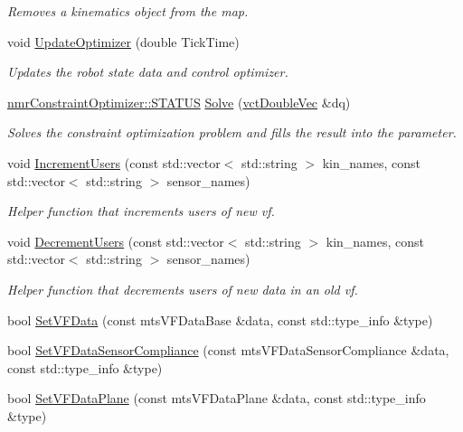 \begin{DoxyCompactItemize}
\begin{DoxyCompactList}\small\item\em Removes a kinematics object from the map. \end{DoxyCompactList}\item 
void \hyperlink{classmts_v_f_controller_a9ea569dcf499c4a086ef9e9751c9e55e}{Update\+Optimizer} (double Tick\+Time)
\begin{DoxyCompactList}\small\item\em Updates the robot state data and control optimizer. \end{DoxyCompactList}\item 
\hyperlink{classnmr_constraint_optimizer_ad46bf972892431d2c0a43a7099aec898}{nmr\+Constraint\+Optimizer\+::\+S\+T\+A\+T\+U\+S} \hyperlink{classmts_v_f_controller_a8f672fd70223794ef98ecf237589cc44}{Solve} (\hyperlink{vct_dynamic_vector_types_8h_ade4b3068c86fb88f41af2e5187e491c2}{vct\+Double\+Vec} \&dq)
\begin{DoxyCompactList}\small\item\em Solves the constraint optimization problem and fills the result into the parameter. \end{DoxyCompactList}\item 
void \hyperlink{classmts_v_f_controller_a0a0eb21d7cad2a07000411e0bb82d34a}{Increment\+Users} (const std\+::vector$<$ std\+::string $>$ kin\+\_\+names, const std\+::vector$<$ std\+::string $>$ sensor\+\_\+names)
\begin{DoxyCompactList}\small\item\em Helper function that increments users of new vf. \end{DoxyCompactList}\item 
void \hyperlink{classmts_v_f_controller_aecb932995a8b1fb3cdfa57ba38947d85}{Decrement\+Users} (const std\+::vector$<$ std\+::string $>$ kin\+\_\+names, const std\+::vector$<$ std\+::string $>$ sensor\+\_\+names)
\begin{DoxyCompactList}\small\item\em Helper function that decrements users of new data in an old vf. \end{DoxyCompactList}\item 
bool \hyperlink{classmts_v_f_controller_a9440eb1cf7cf204da43730bfcbe00ca8}{Set\+V\+F\+Data} (const mts\+V\+F\+Data\+Base \&data, const std\+::type\+\_\+info \&type)
\item 
bool \hyperlink{classmts_v_f_controller_a81a83b84ce61fab4563e344579e6a37a}{Set\+V\+F\+Data\+Sensor\+Compliance} (const mts\+V\+F\+Data\+Sensor\+Compliance \&data, const std\+::type\+\_\+info \&type)
\item 
bool \hyperlink{classmts_v_f_controller_accdcc21711fac674914793949bd02bb1}{Set\+V\+F\+Data\+Plane} (const mts\+V\+F\+Data\+Plane \&data, const std\+::type\+\_\+info \&type)
\end{DoxyCompactItemize}
